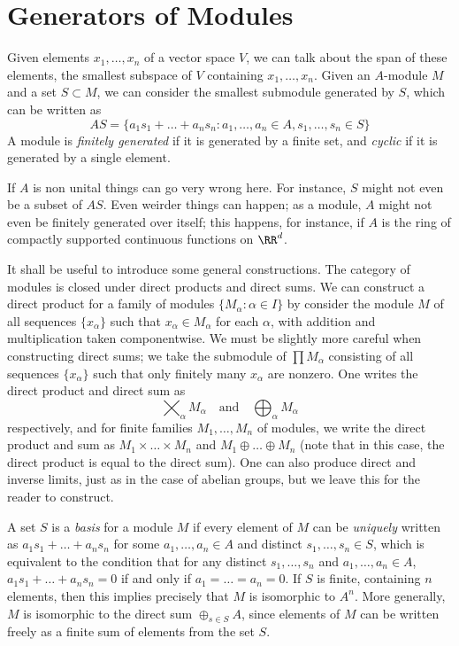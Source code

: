 \section{Generators of Modules}

Given elements $x_1,\dots, x_n$ of a vector space $V$, we can talk about the span of these elements, the smallest subspace of $V$ containing $x_1, \dots, x_n$. Given an $A$-module $M$ and a set $S \subset M$, we can consider the smallest submodule generated by $S$, which can be written as
%
\[ AS = \{ a_1s_1 + \dots + a_ns_n : a_1, \dots, a_n \in A, s_1, \dots, s_n \in S \} \]
%
A module is \emph{finitely generated} if it is generated by a finite set, and \emph{cyclic} if it is generated by a single element.

\begin{remark}
    If $A$ is non unital things can go very wrong here. For instance, $S$ might not even be a subset of $AS$. Even weirder things can happen; as a module, $A$ might not even be finitely generated over itself; this happens, for instance, if $A$ is the ring of compactly supported continuous functions on $\RR^d$.
\end{remark}

It shall be useful to introduce some general constructions. The category of modules is closed under direct products and direct sums. We can construct a direct product for a family of modules $\{ M_\alpha : \alpha \in I \}$ by consider the module $M$ of all sequences $\{ x_\alpha \}$ such that $x_\alpha \in M_\alpha$ for each $\alpha$, with addition and multiplication taken componentwise. We must be slightly more careful when constructing direct sums; we take the submodule of $\prod M_\alpha$ consisting of all sequences $\{ x_\alpha \}$ such that only finitely many $x_\alpha$ are nonzero. One writes the direct product and direct sum as
%
\[ \bigtimes_\alpha M_\alpha\quad\text{and}\quad \bigoplus_\alpha M_\alpha \]
%
respectively, and for finite families $M_1, \dots, M_n$ of modules, we write the direct product and sum as $M_1 \times \dots \times M_n$ and $M_1 \oplus \dots \oplus M_n$ (note that in this case, the direct product is equal to the direct sum). One can also produce direct and inverse limits, just as in the case of abelian groups, but we leave this for the reader to construct.

A set $S$ is a \emph{basis} for a module $M$ if every element of $M$ can be \emph{uniquely} written as $a_1s_1 + \dots + a_ns_n$ for some $a_1, \dots, a_n \in A$ and distinct $s_1, \dots, s_n \in S$, which is equivalent to the condition that for any distinct $s_1,\dots, s_n$ and $a_1,\dots,a_n \in A$, $a_1s_1 + \dots + a_ns_n = 0$ if and only if $a_1 = \dots = a_n = 0$. If $S$ is finite, containing $n$ elements, then this implies precisely that $M$ is isomorphic to $A^n$. More generally, $M$ is isomorphic to the direct sum $\oplus_{s \in S} A$, since elements of $M$ can be written freely as a finite sum of elements from the set $S$.

